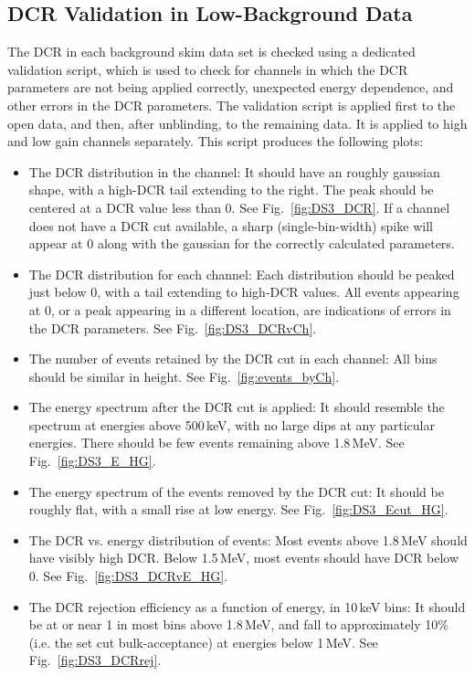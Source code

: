\documentclass[groupedaddress,rmp,amsmath,amssymb,bibnotes,altaffilletter,twocolumn]{revtex4-1}
\begin{document}
\subsection{DCR Validation in Low-Background Data}
The DCR in each background skim data set is checked using a dedicated validation script, which is used to check for channels in which the DCR parameters are not being applied correctly, unexpected energy dependence, and other errors in the DCR parameters.  The validation script is applied first to the open data, and then, after unblinding, to the remaining data. It is applied to high and low gain channels separately. This script produces the following plots:
\begin{itemize}
\item The DCR distribution in the channel: It should have an roughly gaussian shape, with a high-DCR tail extending to the right. The peak should be centered at a DCR value less than 0. See Fig.~\ref{fig:DS3_DCR}. If a channel does not have a DCR cut available, a sharp (single-bin-width) spike will appear at 0 along with the gaussian for the correctly calculated parameters. 
\item The DCR distribution for each channel: Each distribution should be peaked just below 0, with a tail extending to high-DCR values. All events appearing at 0, or a peak appearing in a different location, are indications of errors in the DCR parameters. See Fig.~\ref{fig:DS3_DCRvCh}.
\item The number of events retained by the DCR cut in each channel: All bins should be similar in height. See Fig.~\ref{fig:events_byCh}.
\item The energy spectrum after the DCR cut is applied: It should resemble the \twonubb spectrum at energies above 500\,keV, with no large dips at any particular energies. There should be few events remaining above 1.8\,MeV. See Fig.~\ref{fig:DS3_E_HG}.
\item The energy spectrum of the events removed by the DCR cut: It should be roughly flat, with a small rise at low energy. See Fig.~\ref{fig:DS3_Ecut_HG}.
\item The DCR vs. energy distribution of events: Most events above 1.8\,MeV should have visibly high DCR. Below 1.5\,MeV, most events should have DCR below 0. See Fig.~\ref{fig:DS3_DCRvE_HG}.
\item The DCR rejection efficiency as a function of energy, in 10\,keV bins: It should be at or near 1 in most bins above 1.8\,MeV, and fall to approximately 10\% (i.e. the set cut bulk-acceptance) at energies below 1\,MeV. See Fig.~\ref{fig:DS3_DCRrej}.
\end{itemize}
\end{document}
